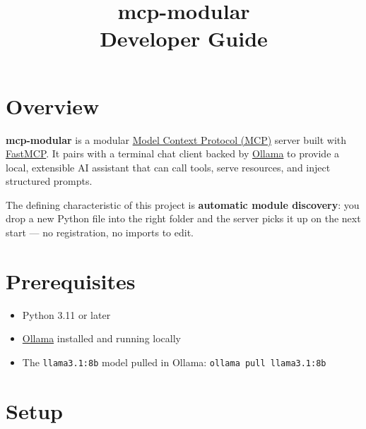 \documentclass[11pt, a4paper]{article}
\title{%
  {\Large\bfseries mcp-modular}\\[4pt]
  {\large Developer Guide}
}
\author{}
\date{}
\begin{document}
\maketitle
\thispagestyle{fancy}

\tableofcontents
\newpage

\section{Overview}

\textbf{mcp-modular} is a modular \href{https://modelcontextprotocol.io}{Model Context Protocol (MCP)} server built with \href{https://github.com/jlowin/fastmcp}{FastMCP}. It pairs with a terminal chat client backed by \href{https://ollama.com}{Ollama} to provide a local, extensible AI assistant that can call tools, serve resources, and inject structured prompts.

The defining characteristic of this project is \textbf{automatic module discovery}: you drop a new Python file into the right folder and the server picks it up on the next start — no registration, no imports to edit.

\section{Prerequisites}

\begin{itemize}[leftmargin=2em]
  \item Python 3.11 or later
  \item \href{https://ollama.com/download}{Ollama} installed and running locally
  \item The \texttt{llama3.1:8b} model pulled in Ollama: \texttt{ollama pull llama3.1:8b}
\end{itemize}

\section{Setup}
\end{document}
